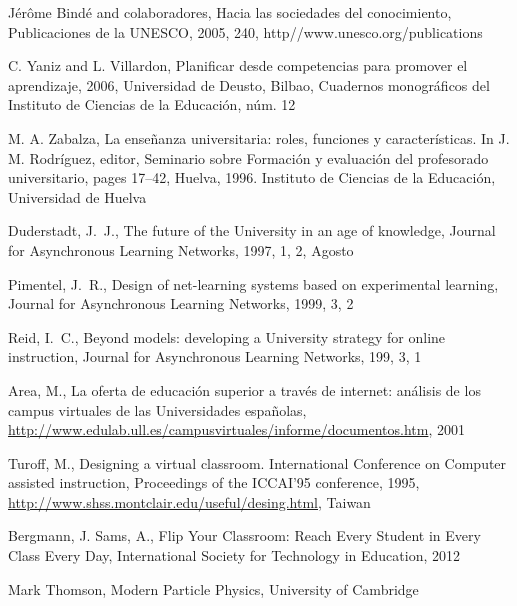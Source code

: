 \begin{thebibliography}{20}
  
  {J\'er\^ome Bind\'e and {colaboradores}, Hacia las sociedades del conocimiento, Publicaciones de la UNESCO, 2005, 240, http//www.unesco.org/publications}

   {C. Yaniz and L. Villardon, Planificar desde competencias para promover el aprendizaje, 2006, Universidad de Deusto, Bilbao, Cuadernos monogr\'aficos del Instituto de Ciencias de la Educaci\'on, n\'um. 12}

   {M. A. Zabalza, La enseñanza universitaria: roles, funciones y características. In J. M. Rodríguez, editor, Seminario sobre Formación y evaluación del profesorado universitario, pages 17–42, Huelva, 1996. Instituto de Ciencias de la Educación, Universidad de Huelva}
   
   {Duderstadt, J.~J., The future of the University in an age of knowledge, Journal for {A}synchronous {L}earning {N}etworks, 1997, 1, 2, Agosto}

   {Pimentel, J.~R., Design of net-learning systems based on experimental learning, Journal for {A}synchronous {L}earning {N}etworks, 1999, 3, 2}
   
   {Reid, I.~C., Beyond models: developing a University strategy for online instruction, Journal for {A}synchronous {L}earning {N}etworks, 199, 3, 1}
   
   {Area, M., La oferta de educación superior a través de internet: análisis de los campus virtuales de las Universidades españolas, \url{http://www.edulab.ull.es/campusvirtuales/informe/documentos.htm}, 2001}

   {Turoff, M., Designing a virtual classroom. International Conference on Computer assisted instruction, Proceedings of the {ICCAI}'95 conference, 1995, \url{http://www.shss.montclair.edu/useful/desing.html}, Taiwan}

   {Bergmann, J. Sams, A., Flip Your Classroom: Reach Every Student in Every Class Every Day, International Society for Technology in Education, 2012}
   
   {Mark Thomson, Modern Particle Physics, University of Cambridge}


\end{thebibliography}